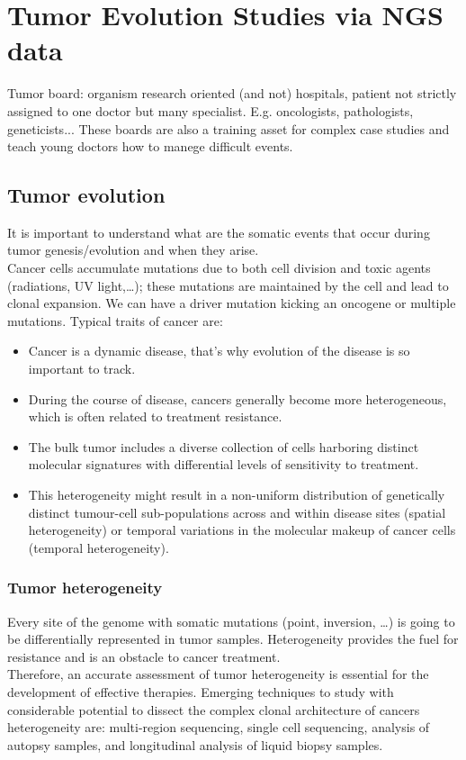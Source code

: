 \graphicspath{{chapters/04/}}
\chapter{Tumor Evolution Studies via NGS data}
Tumor board: organism research oriented (and not) hospitals, patient not strictly assigned to one doctor but many specialist. E.g. oncologists, pathologists, geneticists... These boards are also a training asset for complex case studies and teach young doctors how to manege difficult events.
\\
\section{Tumor evolution}
It is important to understand what are the somatic events that occur during tumor genesis/evolution and when they arise.\\
Cancer cells accumulate mutations due to both cell division and toxic agents (radiations, UV light,…); these mutations are maintained by the cell and lead to clonal expansion.  We can have a driver mutation kicking an oncogene or multiple mutations.
Typical traits of cancer are:
\begin{itemize}
\item Cancer is a dynamic disease, that's why evolution of the disease is so important to track.
\item During the course of disease, cancers generally become more heterogeneous, which is often related to treatment resistance.
\item The bulk tumor includes a diverse collection of cells harboring distinct molecular signatures with differential levels of sensitivity to treatment.
\item This heterogeneity might result in a non-uniform distribution of genetically distinct tumour-cell sub-populations across and within disease sites (spatial heterogeneity) or temporal variations in the molecular makeup of cancer cells (temporal heterogeneity).
\end{itemize}

\subsection{Tumor heterogeneity}
Every site of the genome with somatic mutations (point, inversion, …) is going to be differentially represented in tumor samples. Heterogeneity provides the fuel for resistance and is an obstacle to cancer treatment.
\\
Therefore, an accurate assessment of tumor heterogeneity is essential for the development of effective therapies. Emerging techniques to study with considerable potential to dissect the complex clonal architecture of cancers heterogeneity are: multi-region sequencing, single cell sequencing, analysis of autopsy samples, and longitudinal analysis of liquid biopsy samples.
\\
\\


